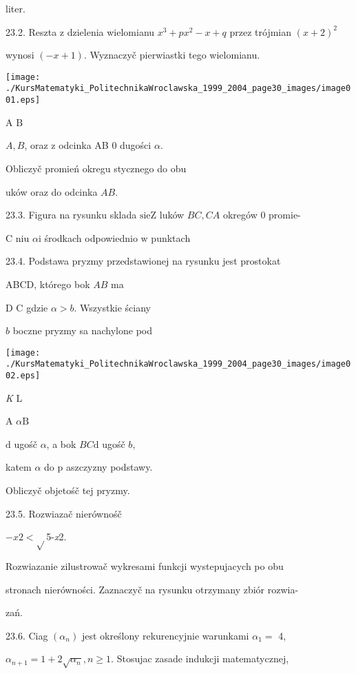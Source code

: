 \documentclass[a4paper,12pt]{article}
\begin{document}
liter.

23.2. Reszta $\mathrm{z}$ dzielenia wielomianu $x^{3}+px^{2}-x+q$ przez trójmian $(x+2)^{2}$

wynosi $(-x+1)$. Wyznaczyč pierwiastki tego wielomianu.
\begin{center}
\texttt{[image: ./KursMatematyki\_PolitechnikaWroclawska\_1999\_2004\_page30\_images/image001.eps]}
\end{center}
A $\mathrm{B}$

$A, B$, oraz $\mathrm{z}$ odcinka AB $0$ dugości $\alpha.$

Obliczyč promień okregu stycznego do obu

uków oraz do odcinka $AB.$

23.3. Figura na rysunku sklada $\mathrm{s}\mathrm{i}\mathrm{e}\mathrm{Z}$ luków $BC, CA$ okregów $0$ promie-

C niu $\alpha \mathrm{i}$ środkach odpowiednio $\mathrm{w}$ punktach

23.4. Podstawa pryzmy przedstawionej na rysunku jest prostokat

ABCD, którego bok $AB$ ma

D $\mathrm{C}$ gdzie $\alpha > b$. Wszystkie ściany

$b$ boczne pryzmy sa nachylone pod
\begin{center}
\texttt{[image: ./KursMatematyki\_PolitechnikaWroclawska\_1999\_2004\_page30\_images/image002.eps]}
\end{center}
{\it K} $\mathrm{L}$

A $\alpha \mathrm{B}$

$\mathrm{d}$ ugośč $\alpha$, a bok $BC \mathrm{d}$ ugośč $b,$

katem $\alpha$ do $\mathrm{p}$ aszczyzny podstawy.

Obliczyč objetośč tej pryzmy.

23.5. Rozwiazač nierównośč

$- x2<\sqrt{}$5-{\it x}2.

Rozwiazanie zilustrowač wykresami funkcji wystepujacych po obu

stronach nierówności. Zaznaczyč na rysunku otrzymany zbiór rozwia-

zań.

23.6. Ciag $(\alpha_{n})$ jest określony rekurencyjnie warunkami $\alpha_{1} =$ 4,

$\alpha_{n+1} = 1+2\sqrt{\alpha_{n}}, n \geq 1$. Stosujac zasade indukcji matematycznej,
\end{document}
